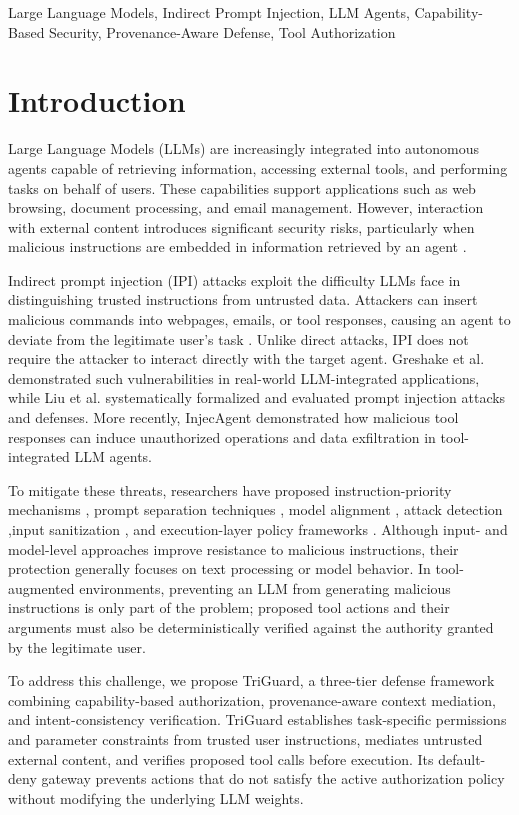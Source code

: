 \documentclass[conference]{IEEEtran}
\begin{document}
\begin{IEEEkeywords}
Large Language Models, Indirect Prompt Injection, LLM Agents, Capability-Based Security, Provenance-Aware Defense, Tool Authorization
\end{IEEEkeywords}

\section{Introduction}
Large Language Models (LLMs) are increasingly integrated into autonomous agents capable of retrieving information, accessing external tools, and performing tasks on behalf of users. These capabilities support applications such as web browsing, document processing, and email management. However, interaction with external content introduces significant security risks, particularly when malicious instructions are embedded in information retrieved by an agent \cite{b1, b2}.

Indirect prompt injection (IPI) attacks exploit the difficulty LLMs face in distinguishing trusted instructions from untrusted data. Attackers can insert malicious commands into webpages, emails, or tool responses, causing an agent to deviate from the legitimate user's task \cite{b1}. Unlike direct attacks, IPI does not require the attacker to interact directly with the target agent. Greshake et al. \cite{b1} demonstrated such vulnerabilities in real-world LLM-integrated applications, while Liu et al. \cite{b2} systematically formalized and evaluated prompt injection attacks and defenses. More recently, InjecAgent \cite{b3} demonstrated how malicious tool responses can induce unauthorized operations and data exfiltration in tool-integrated LLM agents.

To mitigate these threats, researchers have proposed instruction-priority mechanisms \cite{b4}, prompt separation techniques \cite{b5, b6}, model alignment \cite{b7}, attack detection \cite{b8, b9, b10, b11},input sanitization \cite{b12, b13, b14}, and execution-layer policy frameworks \cite{b16, b17, b18, b19, b20, b21, b22}. Although input- and model-level approaches improve resistance to malicious instructions, their protection generally focuses on text processing or model behavior. In tool-augmented environments, preventing an LLM from generating malicious instructions is only part of the problem; proposed tool actions and their arguments must also be deterministically verified against the authority granted by the legitimate user.

To address this challenge, we propose TriGuard, a three-tier defense framework combining capability-based authorization, provenance-aware context mediation, and intent-consistency verification. TriGuard establishes task-specific permissions and parameter constraints from trusted user instructions, mediates untrusted external content, and verifies proposed tool calls before execution. Its default-deny gateway prevents actions that do not satisfy the active authorization policy without modifying the underlying LLM weights.
\end{document}
